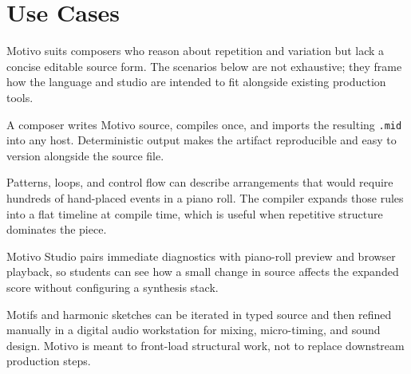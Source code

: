 \section{Use Cases}\label{sec:use-cases}

Motivo suits composers who reason about repetition and variation but lack a concise editable source form.
The scenarios below are not exhaustive; they frame how the language and studio are intended to fit alongside
existing production tools.

A composer writes Motivo source, compiles once, and imports the resulting \texttt{.mid} into any host.
Deterministic output makes the artifact reproducible and easy to version alongside the source file.

Patterns, loops, and control flow can describe arrangements that would require hundreds of hand-placed events in a
piano roll.
The compiler expands those rules into a flat timeline at compile time, which is useful when repetitive structure
dominates the piece.

Motivo Studio pairs immediate diagnostics with piano-roll preview and browser playback, so students can see how a small
change in source affects the expanded score without configuring a synthesis stack.

Motifs and harmonic sketches can be iterated in typed source and then refined manually in a digital audio workstation
for mixing, micro-timing, and sound design.
Motivo is meant to front-load structural work, not to replace downstream production steps.
